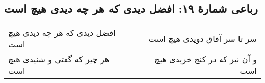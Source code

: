 \begin{center}
\section*{رباعی شمارهٔ ۱۹: افضل دیدی که هر چه دیدی هیچ است}
\label{sec:019}
\begin{longtable}{l p{0.5cm} r}
افضل دیدی که هر چه دیدی هیچ است
&&
سر تا سر آفاق دویدی هیچ است
\\
هر چیز که گفتی و شنیدی هیچ است
&&
و آن نیز که در کنج خزیدی هیچ است
\\
\end{longtable}
\end{center}
